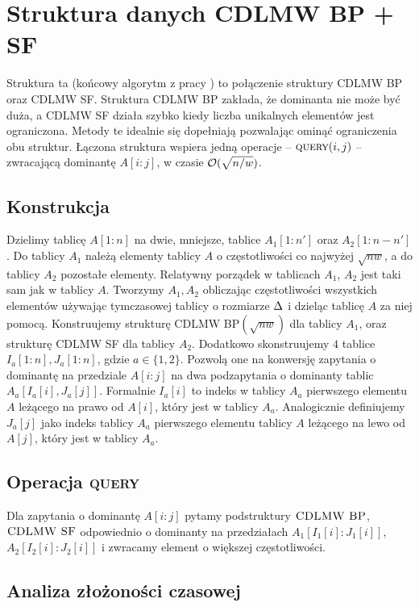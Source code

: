 \section{\large Struktura danych \textsc{CDLMW BP + SF}}
\label{sec:cdlmw-bp-sf}
Struktura ta (końcowy algorytm z pracy \cite{chan14}) to połączenie struktury \textsc{CDLMW BP} oraz \textsc{CDLMW SF}. Struktura \textsc{CDLMW BP} zakłada, że dominanta nie może być duża, a \textsc{CDLMW SF} działa szybko kiedy liczba unikalnych elementów jest ograniczona. Metody te idealnie się dopełniają pozwalając ominąć ograniczenia obu struktur. Łączona struktura wspiera jedną operacje -- $\textsc{query}(i,j)$ -- zwracającą dominantę $A[i:j]$, w czasie $\mathcal{O}(\sqrt{n/w})$.

\subsection{Konstrukcja}
Dzielimy tablicę $A[1:n]$ na dwie, mniejsze, tablice $A_1[1:n']$ oraz $A_2[1:n-n']$. Do tablicy $A_1$ należą elementy tablicy $A$ o częstotliwości co najwyżej $\sqrt{nw}$, a do tablicy $A_2$ pozostałe elementy. Relatywny porządek w tablicach $A_1$, $A_2$ jest taki sam jak w tablicy $A$. Tworzymy $A_1, A_2$ obliczając częstotliwości wszystkich elementów używając tymczasowej tablicy o rozmiarze $\Delta$ i dzieląc tablicę $A$ za niej pomocą. Konstruujemy strukturę CDLMW BP$(\sqrt{nw})$ dla tablicy $A_1$, oraz strukturę \textsc{CDLMW SF} dla tablicy $A_2$. Dodatkowo skonstruujemy $4$ tablice $I_a[1:n], J_a[1:n]$, gdzie $a \in \{1, 2\}$. Pozwolą one na konwersję zapytania o dominantę na przedziale $A[i:j]$ na dwa podzapytania o dominanty tablic $A_a[I_a[i], J_a[j]]$. Formalnie $I_a[i]$ to indeks w tablicy $A_a$ pierwszego elementu $A$ leżącego na prawo od $A[i]$, który jest w tablicy $A_a$. Analogicznie definiujemy $J_a[j]$ jako indeks tablicy $A_a$ pierwszego elementu tablicy $A$ leżącego na lewo od $A[j]$, który jest w tablicy $A_a$.

\subsection{Operacja \textsc{query}}
Dla zapytania o dominantę $A[i:j]$ pytamy podstruktury $\textsc{CDLMW BP}$, $\textsc{CDLMW SF}$ odpowiednio o dominanty na przedziałach $A_1[I_1[i]:J_1[i]]$, $A_2[I_2[i]:J_2[i]]$ i zwracamy element o większej częstotliwości.

\subsection{Analiza złożoności czasowej}
